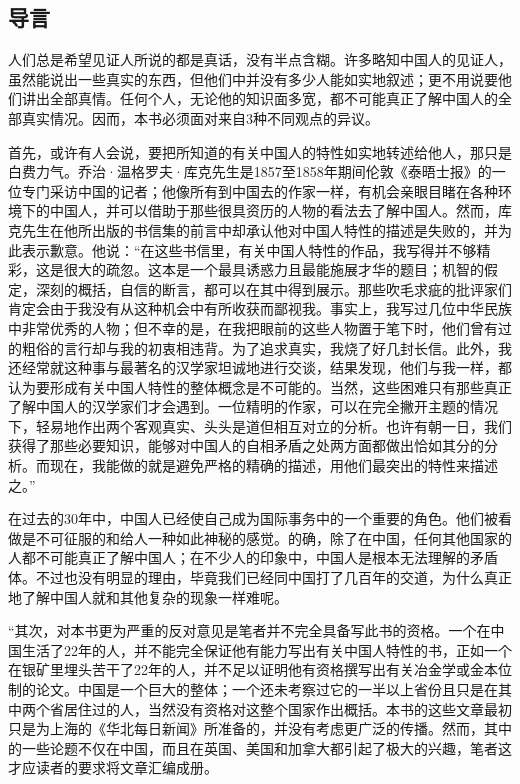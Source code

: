 \documentclass[12pt,oneside]{book}
\begin{document}
\begin{common-format}
\mainmatter

\chapter{导言}
人们总是希望见证人所说的都是真话，没有半点含糊。许多略知中国人的见证人，虽然能说出一些真实的东西，但他们中并没有多少人能如实地叙述；更不用说要他们讲出全部真情。任何个人，无论他的知识面多宽，都不可能真正了解中国人的全部真实情况。因而，本书必须面对来自3种不同观点的异议。 

首先，或许有人会说，要把所知道的有关中国人的特性如实地转述给他人，那只是白费力气。乔治·温格罗夫·库克先生是1857至1858年期间伦敦《泰晤士报》的一位专门采访中国的记者；他像所有到中国去的作家一样，有机会亲眼目睹在各种环境下的中国人，并可以借助于那些很具资历的人物的看法去了解中国人。然而，库克先生在他所出版的书信集的前言中却承认他对中国人特性的描述是失败的，并为此表示歉意。他说：“在这些书信里，有关中国人特性的作品，我写得并不够精彩，这是很大的疏忽。这本是一个最具诱惑力且最能施展才华的题目；机智的假定，深刻的概括，自信的断言，都可以在其中得到展示。那些吹毛求疵的批评家们肯定会由于我没有从这种机会中有所收获而鄙视我。事实上，我写过几位中华民族中非常优秀的人物；但不幸的是，在我把眼前的这些人物置于笔下时，他们曾有过的粗俗的言行却与我的初衷相违背。为了追求真实，我烧了好几封长信。此外，我还经常就这种事与最著名的汉学家坦诚地进行交谈，结果发现，他们与我一样，都认为要形成有关中国人特性的整体概念是不可能的。当然，这些困难只有那些真正了解中国人的汉学家们才会遇到。一位精明的作家，可以在完全撇开主题的情况下，轻易地作出两个客观真实、头头是道但相互对立的分析。也许有朝一日，我们获得了那些必要知识，能够对中国人的自相矛盾之处两方面都做出恰如其分的分析。而现在，我能做的就是避免严格的精确的描述，用他们最突出的特性来描述之。” 

在过去的30年中，中国人已经使自己成为国际事务中的一个重要的角色。他们被看做是不可征服的和给人一种如此神秘的感觉。的确，除了在中国，任何其他国家的人都不可能真正了解中国人；在不少人的印象中，中国人是根本无法理解的矛盾体。不过也没有明显的理由，毕竟我们已经同中国打了几百年的交道，为什么真正地了解中国人就和其他复杂的现象一样难呢。 

“其次，对本书更为严重的反对意见是笔者并不完全具备写此书的资格。一个在中国生活了22年的人，并不能完全保证他有能力写出有关中国人特性的书，正如一个在银矿里埋头苦干了22年的人，并不足以证明他有资格撰写出有关冶金学或金本位制的论文。中国是一个巨大的整体；一个还未考察过它的一半以上省份且只是在其中两个省居住过的人，当然没有资格对这整个国家作出概括。本书的这些文章最初只是为上海的《华北每日新闻》所准备的，并没有考虑更广泛的传播。然而，其中的一些论题不仅在中国，而且在英国、美国和加拿大都引起了极大的兴趣，笔者这才应读者的要求将文章汇编成册。 


\end{common-format}
\end{document}
